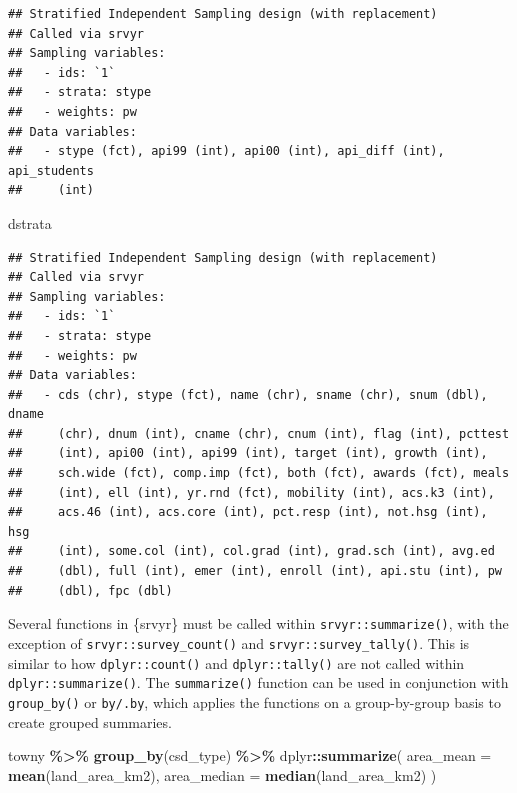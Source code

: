 \documentclass[
]{krantz}
\makeatletter
\newenvironment{Shaded}{\begin{snugshade}}{\end{snugshade}}
\newcommand{\AttributeTok}[1]{\textcolor[rgb]{0.27,0.27,0.27}{#1}}
\newcommand{\FunctionTok}[1]{\textcolor[rgb]{0.27,0.27,0.27}{\textbf{#1}}}
\newcommand{\NormalTok}[1]{#1}
\newcommand{\SpecialCharTok}[1]{\textcolor[rgb]{0.43,0.43,0.43}{\textbf{#1}}}
\newenvironment{kframe}{%
\medskip{}
\setlength{\fboxsep}{.8em}
 \def\at@end@of@kframe{}%
 \ifinner\ifhmode%
  \def\at@end@of@kframe{\end{minipage}}%
  \begin{minipage}{\columnwidth}%
 \fi\fi%
 \def\FrameCommand##1{\hskip\@totalleftmargin \hskip-\fboxsep
 \colorbox{shadecolor}{##1}\hskip-\fboxsep
     \hskip-\linewidth \hskip-\@totalleftmargin \hskip\columnwidth}%
 \MakeFramed {\advance\hsize-\width
   \@totalleftmargin\z@ \linewidth\hsize
   \@setminipage}}%
 {\par\unskip\endMakeFramed%
 \at@end@of@kframe}
\renewenvironment{Shaded}{\begin{kframe}}{\end{kframe}}
\makeatother
\begin{document}
\begin{verbatim}
## Stratified Independent Sampling design (with replacement)
## Called via srvyr
## Sampling variables:
##   - ids: `1` 
##   - strata: stype 
##   - weights: pw 
## Data variables: 
##   - stype (fct), api99 (int), api00 (int), api_diff (int), api_students
##     (int)
\end{verbatim}

\begin{Shaded}
\begin{Highlighting}[]
\NormalTok{dstrata}
\end{Highlighting}
\end{Shaded}

\begin{verbatim}
## Stratified Independent Sampling design (with replacement)
## Called via srvyr
## Sampling variables:
##   - ids: `1` 
##   - strata: stype 
##   - weights: pw 
## Data variables: 
##   - cds (chr), stype (fct), name (chr), sname (chr), snum (dbl), dname
##     (chr), dnum (int), cname (chr), cnum (int), flag (int), pcttest
##     (int), api00 (int), api99 (int), target (int), growth (int),
##     sch.wide (fct), comp.imp (fct), both (fct), awards (fct), meals
##     (int), ell (int), yr.rnd (fct), mobility (int), acs.k3 (int),
##     acs.46 (int), acs.core (int), pct.resp (int), not.hsg (int), hsg
##     (int), some.col (int), col.grad (int), grad.sch (int), avg.ed
##     (dbl), full (int), emer (int), enroll (int), api.stu (int), pw
##     (dbl), fpc (dbl)
\end{verbatim}

Several functions in \{srvyr\} must be called within \texttt{srvyr::summarize()}, with the exception of \texttt{srvyr::survey\_count()} and \texttt{srvyr::survey\_tally()}. This is similar to how \texttt{dplyr::count()} and \texttt{dplyr::tally()} are not called within \texttt{dplyr::summarize()}. The \texttt{summarize()} function can be used in conjunction with \texttt{group\_by()} or \texttt{by/.by}, which applies the functions on a group-by-group basis to create grouped summaries.

\begin{Shaded}
\begin{Highlighting}[]
\NormalTok{towny }\SpecialCharTok{\%\textgreater{}\%}
  \FunctionTok{group\_by}\NormalTok{(csd\_type) }\SpecialCharTok{\%\textgreater{}\%}
\NormalTok{  dplyr}\SpecialCharTok{::}\FunctionTok{summarize}\NormalTok{(}
    \AttributeTok{area\_mean =} \FunctionTok{mean}\NormalTok{(land\_area\_km2),}
    \AttributeTok{area\_median =} \FunctionTok{median}\NormalTok{(land\_area\_km2)}
\NormalTok{  )}
\end{Highlighting}
\end{Shaded}
\end{document}
